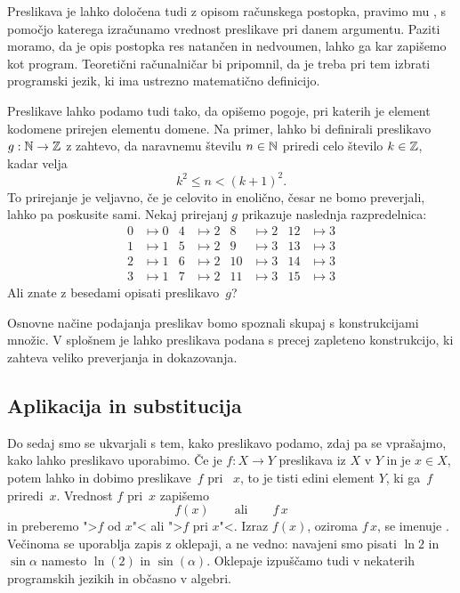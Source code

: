 Preslikava je lahko določena tudi z opisom računskega postopka, pravimo mu ,
s pomočjo katerega izračunamo vrednost preslikave pri danem argumentu. Paziti moramo, da je
opis postopka res natančen in nedvoumen, lahko ga kar zapišemo kot program. Teoretični
računalničar bi pripomnil, da je treba pri tem izbrati programski jezik, ki ima ustrezno
matematično definicijo.

Preslikave lahko podamo tudi tako, da opišemo pogoje, pri katerih je element kodomene
prirejen elementu domene. Na primer, lahko bi definirali preslikavo $g : \mathbb{N} \to \mathbb{Z}$ z
zahtevo, da naravnemu številu $n \in \mathbb{N}$ priredi celo število $k \in \mathbb{Z}$, kadar velja
%
\begin{equation*}
  k^2 \leq n < (k+1)^2.
\end{equation*}
%
To prirejanje je veljavno, če je celovito in enolično, česar ne bomo preverjali, lahko pa
poskusite sami. Nekaj prirejanj $g$ prikazuje naslednja razpredelnica:
%
\begin{align*}
0 &\mapsto 0   &   4 &\mapsto 2   &    8  &\mapsto 2   &   12 &\mapsto 3 \\
1 &\mapsto 1   &   5 &\mapsto 2   &    9  &\mapsto 3   &   13 &\mapsto 3 \\
2 &\mapsto 1   &   6 &\mapsto 2   &    10 &\mapsto 3   &   14 &\mapsto 3 \\
3 &\mapsto 1   &   7 &\mapsto 2   &    11 &\mapsto 3   &   15 &\mapsto 3
\end{align*}
%
Ali znate z besedami opisati preslikavo~$g$?

Osnovne načine podajanja preslikav bomo spoznali skupaj s
konstrukcijami množic.
%
V splošnem je lahko preslikava podana s precej zapleteno konstrukcijo, ki zahteva veliko
preverjanja in dokazovanja.

\subsection{Aplikacija in substitucija}
\label{sec:aplikacija-in-subsitucija}

Do sedaj smo se ukvarjali s tem, kako preslikavo podamo, zdaj pa se vprašajmo, kako lahko
preslikavo uporabimo. Če je $f : X \to Y$ preslikava iz $X$ v $Y$ in je $x \in X$, potem
lahko  in dobimo  preslikave~$f$ pri
~$x$, to je tisti edini element $Y$, ki ga~$f$ priredi~$x$. Vrednost $f$
pri~$x$ zapišemo
%
\begin{equation*}
  f(x)
  \qquad\text{ali}\qquad
  f\,x
\end{equation*}
%
in preberemo ">$f$ od $x$"< ali ">$f$ pri $x$"<. Izraz $f(x)$, oziroma $f\,x$, se imenuje
. Večinoma se uporablja zapis z oklepaji, a ne vedno: navajeni smo pisati
$\ln 2$ in $\sin \alpha$ namesto $\ln(2)$ in $\sin(\alpha)$. Oklepaje izpuščamo tudi v
nekaterih programskih jezikih in občasno v algebri.

